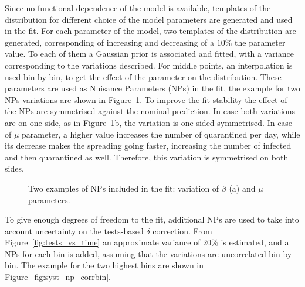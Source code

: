  
Since no functional dependence of the model is available, templates of the distribution for different choice of the model parameters are generated and used in the fit. For each parameter of the model, two templates of the distribution are generated, corresponding of increasing and decreasing of a $10\%$ the parameter value. To each of them a Gaussian prior is associated and fitted, with a variance corresponding to the variations described. For middle points, an interpolation is used bin-by-bin, to get the effect of the parameter on the distribution. These parameters are used as Nuisance Parameters (NPs) in the fit, the example for two NPs variations are shown in Figure~\ref{fig:syst_np}. To improve the fit stability the effect of the NPs are symmetrised against the nominal prediction. In case both variations are on one side, as in Figure~\ref{fig:syst_np}b, the variation is one-sided symmetrised. In case of $\mu$ parameter, a higher value increases the number of quarantined per day, while its decrease makes the spreading going faster, increasing the number of infected and then quarantined as well. Therefore, this variation is symmetrised on both sides.\\

\begin{figure}
\centering
{}
  \caption{Two examples of NPs included in the fit: variation of $\beta$ (a) and $\mu$ parameters.}
  \label{fig:syst_np}
\end{figure}

To give enough degrees of freedom to the fit, additional NPs are used to take into account uncertainty on the tests-based $\delta$ correction. From Figure~\ref{fig:tests_vs_time} an approximate variance of $20\%$ is estimated, and a NPs for each bin is added, assuming that the variations are uncorrelated bin-by-bin. The example for the two highest bins are shown in Figure~\ref{fig:syst_np_corrbin}.


